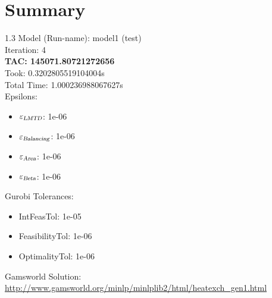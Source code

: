\documentclass{article}%
\begin{document}
%
\normalsize%
\section{Summary}%
\thispagestyle{plain}%
\begin{spacing}{1.3}%
\Large%
Model (Run-name): model1 (test)\\%
Iteration: 4\\%
\textbf{TAC: 145071.80721272656}\\%
Took: 0.3202805519104004s\\%
Total Time: 1.000236988067627s\\%
Epsilons:%
\begin{itemize}%
	\item $\varepsilon_{\textsl{LMTD}}$: 1e-06%
	\item $\varepsilon_{\textsl{Balancing}}$: 1e-06%
	\item $\varepsilon_{\textsl{Area}}$: 1e-06%
	\item $\varepsilon_{\textsl{Beta}}$: 1e-06%
\end{itemize}%
Gurobi Tolerances:%
\begin{itemize}%
	\item IntFeasTol: 1e-05%
	\item FeasibilityTol: 1e-06%
	\item OptimalityTol: 1e-06%
\end{itemize}%
\end{spacing}%
\normalsize%
Gamsworld Solution: \url{http://www.gamsworld.org/minlp/minlplib2/html/heatexch_gen1.html}%
%
\clearpage%
\end{document}
